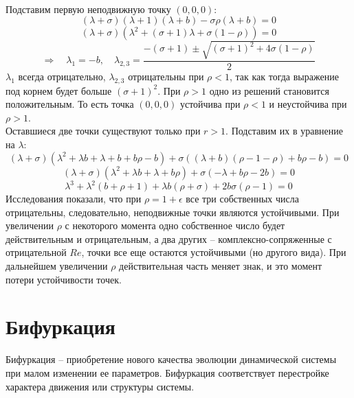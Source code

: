\documentclass[12pt]{article}
\begin{document}
\begin{enumerate}
\\ Подставим первую неподвижную точку $(0, 0, 0)$:
\begin{equation*}
(\lambda+\sigma)(\lambda+1)(\lambda+b)-\sigma\rho(\lambda+b)=0
\end{equation*}
\begin{equation*}
(\lambda+\sigma)(\lambda^2+(\sigma+1)\lambda+\sigma(1-\rho))=0
\end{equation*}
\begin{equation*}
\Rightarrow \quad \lambda_1=-b, \quad \lambda_{2,3}=\frac{-(\sigma+1)\pm\sqrt{(\sigma+1)^2+4\sigma(1-\rho)}}{2}
\end{equation*}
$\lambda_1$ всегда отрицательно, $\lambda_{2,3}$ отрицательны при $\rho<1$, так как тогда выражение под корнем будет больше $(\sigma+1)^2$. При $\rho>1$ одно из решений становится положительным. То есть точка $(0, 0, 0)$ устойчива при $\rho<1$ и неустойчива при $\rho>1$.
\\ Оставшиеся две точки существуют только при $r>1$. Подставим их в уравнение на $\lambda$:
\begin{equation*}
(\lambda+\sigma)(\lambda^2+\lambda b+\lambda+b+b\rho-b)+\sigma((\lambda+b)(\rho-1-\rho)+b\rho-b)=0
\end{equation*}
\begin{equation*}
(\lambda+\sigma)(\lambda^2+\lambda b+\lambda+b\rho)+\sigma(-\lambda+b\rho-2b)=0
\end{equation*}
\begin{equation*}
\lambda^3+\lambda^2(b+\rho+1)+\lambda b(\rho+\sigma)+2b\sigma(\rho-1)=0
\end{equation*}
Исследования показали, что при $\rho=1+\epsilon$ все три собственных числа отрицательны, следовательно, неподвижные точки являются устойчивыми. При увеличении $\rho$ с некоторого момента одно собственное число будет действительным и отрицательным, а два других -- комплексно-сопряженные с отрицательной $Re$, точки все еще остаются устойчивыми (но другого вида). При дальнейшем увеличении $\rho$ действительная часть меняет знак, и это момент потери устойчивости точек.

\end{enumerate}

\section{Бифуркация}

Бифуркация -- приобретение нового качества эволюции
динамической системы при малом изменении ее параметров.
Бифуркация соответствует перестройке характера движения
или структуры системы.
\end{document}
